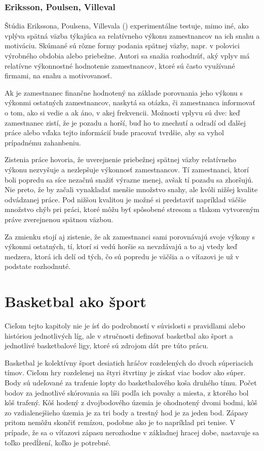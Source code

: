 \documentclass[
  digital, %
  twoside, %
  notable,   %
  lof,     %
  lot,     %
]{fithesis3}
\begin{document}
		\subsection{Eriksson, Poulsen, Villeval}
		Štúdia Erikssona, Poulsena, Villevala (\citeyear{eriksson2009}) experimentálne testuje, mimo iné, ako vplýva spätná väzba týkajúca sa relatívneho výkonu zamestnancov na ich snahu a motiváciu. Skúmané sú rôzne formy podania spätnej väzby, napr. v polovici výrobného obdobia alebo priebežne. Autori sa snažia rozhodnúť, aký vplyv má relatívne výkonnostné hodnotenie zamestnancov, ktoré sú často využívané firmami, na snahu a motivovanosť.
		
		Ak je zamestnanec finančne hodnotený na základe porovnania jeho výkonu s výkonmi ostatných zamestnancov, naskytá sa otázka, či zamestnanca informovať o tom, ako si vedie a ak áno, v akej frekvencii. Možnosti vplyvu sú dve: keď zamestnanec zistí, že je pozadu a horší, buď ho to znechutí a odradí od ďalšej práce alebo vďaka tejto informácií bude pracovať tvrdšie, aby sa vyhol prípadnému zahanbeniu. \parencite[s.~679]{eriksson2009}
		
		Zistenia práce hovoria, že uverejnenie priebežnej spätnej väzby relatívneho výkonu nezvyšuje a nezlepšuje výkonnosť zamestnancov. Tí zamestnanci, ktorí boli popredu sa síce nezačnú snažiť výrazne menej, avšak tí pozadu sa zhoršujú. Nie preto, že by začali vynakladať menšie množstvo snahy, ale kvôli nižšej kvalite odvádzanej práce. Pod nižšou kvalitou je možné si predstaviť napríklad väčšie množstvo chýb pri práci, ktoré môžu byť spôsobené stresom a tlakom vytvoreným práve zverejnenou spätnou väzbou. \parencite[s.~687]{eriksson2009}
		
		Za zmienku stojí aj zistenie, že ak zamestnanci sami porovnávajú svoje výkony s výkonmi ostatných, tí, ktorí si vedú horšie sa nevzdávajú a to aj vtedy keď medzera, ktorá ich delí od tých, čo sú popredu je väčšia a o víťazovi je už v podstate rozhodnuté. \parencite[s.~686]{eriksson2009}
		
				
	\chapter{Basketbal ako šport}
	Cieľom tejto kapitoly nie je ísť do podrobností v súvislosti s pravidlami alebo históriou jednotlivých líg, ale v stručnosti definovať basketbal ako šport a jednotlivé basketbalové ligy, ktoré sú zdrojom dát pre túto prácu.
	
	Basketbal je kolektívny šport desiatich hráčov rozdelených do dvoch súperiacich tímov. Cieľom hry rozdelenej na štyri štvrtiny je získať viac bodov ako súper. Body sú udeľované za trafenie lopty do basketbalového koša druhého tímu. Počet bodov za jednotlivé skórovania sa líši podľa ich povahy a miesta, z ktorého bol kôš trafený. Kôš hodený z dvojbodového územia je ohodnotený dvomi bodmi, kôš zo vzdialenejšieho územia je za tri body a trestný hod je za jeden bod. Zápasy pritom nemôžu skončiť remízou, podobne ako je to napríklad pri tenise. V prípade, že sa o víťazovi zápasu nerozhodne v základnej hracej dobe, nastavuje sa toľko predĺžení, koľko je potrebné.
	
\end{document}
